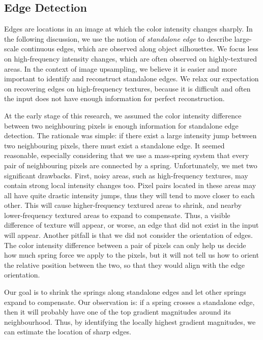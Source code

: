 \subsection{Edge Detection}\label{sec:edgedetect}

Edges are locations in an image at which the color intensity changes sharply. In the following discussion, we use the notion of \textit{standalone edge} to describe large-scale continuous edges, which are observed along object silhouettes. We focus less on high-frequency intensity changes, which are often observed on highly-textured areas. In the context of image upsampling, we believe it is easier and more important to identify and reconstruct standalone edges. We relax our expectation on recovering edges on high-frequency textures, because it is difficult and often the input does not have enough information for perfect reconstruction.

At the early stage of this research, we assumed the color intensity difference between two neighbouring pixels is enough information for standalone edge detection. The rationale was simple: if there exist a large intensity jump between two neighbouring pixels, there must exist a standalone edge. It seemed reasonable, especially considering that we use a mass-spring system that every pair of neighbouring pixels are connected by a spring. Unfortunately, we met two significant drawbacks. First, noisy areas, such as high-frequency textures, may contain strong local intensity changes too. Pixel pairs located in these areas may all have quite drastic intensity jumps, thus they will tend to move closer to each other. This will cause higher-frequency textured areas to shrink, and nearby lower-frequency textured areas to expand to compensate. Thus, a visible difference of texture will appear, or worse, an edge that did not exist in the input will appear. Another pitfall is that we did not consider the orientation of edges. The color intensity difference between a pair of pixels can only help us decide how much spring force we apply to the pixels, but it will not tell us how to orient the relative position between the two, so that they would align with the edge orientation. 

Our goal is to shrink the springs along standalone edges and let other springs expand to compensate. Our observation is: if a spring crosses a standalone edge, then it will probably have one of the top gradient magnitudes around its neighbourhood. Thus, by identifying the locally highest gradient magnitudes, we can estimate the location of sharp edges. 


